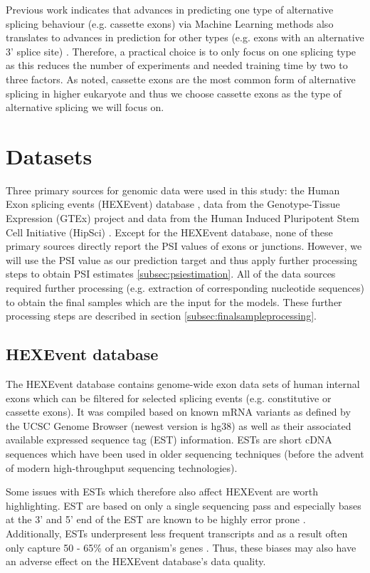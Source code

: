 Previous work indicates that advances in predicting one type of alternative splicing behaviour (e.g. cassette exons) via Machine Learning methods also translates to advances in prediction for other types (e.g. exons with an alternative 3' splice site) \cite{dsc} \cite{buschhertel}. Therefore, a practical choice is to only focus on one splicing type as this reduces the number of experiments and needed training time by two to three factors. As noted, cassette exons are the most common form of alternative splicing in higher eukaryote and thus we choose cassette exons as the type of alternative splicing we will focus on.

\section{Datasets}\label{sec:datasets}
Three primary sources for genomic data were used in this study: the Human Exon splicing events (HEXEvent) database \cite{hexevent}, data from the Genotype-Tissue Expression (GTEx) project \cite{gtex} and data from the Human Induced Pluripotent Stem Cell Initiative (HipSci) \cite{hipsci}. Except for the HEXEvent database, none of these primary sources directly report the PSI values of exons or junctions. However, we will use the PSI value as our prediction target and thus apply further processing steps to obtain PSI estimates \ref{subsec:psiestimation}. All of the data sources required further processing (e.g. extraction of corresponding nucleotide sequences) to obtain the final samples which are the input for the models. These further processing steps are described in section \ref{subsec:finalsampleprocessing}.


\subsection{HEXEvent database} \label{subsec:hexevent}
The HEXEvent database contains genome-wide exon data sets of human internal exons which can be filtered for selected splicing events (e.g. constitutive or cassette exons). It was compiled based on known mRNA variants as defined by the UCSC Genome Browser (newest version is hg38) as well as their associated available expressed sequence tag (EST) information. ESTs are short cDNA sequences which have been used in older sequencing techniques (before the advent of modern high-throughput sequencing technologies). 

Some issues with ESTs which therefore also affect HEXEvent are worth highlighting. EST are based on only a single sequencing pass and especially bases at the 3' and 5' end of the EST are known to be highly error prone \cite{hitchhiker}. Additionally, ESTs underpresent less frequent transcripts and as a result often only capture 50 - 65\% of an organism's genes \cite{estunderrepresenttransripts}. Thus, these biases may also have an adverse effect on the HEXEvent database's data quality.

